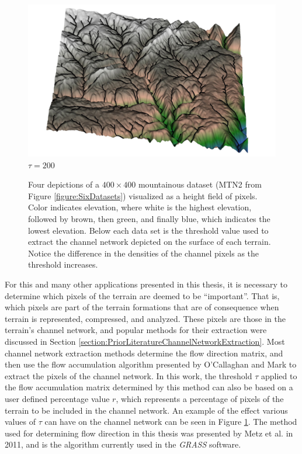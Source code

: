\begin{figure}[t]
\begin{center}
  \begin{minipage}{0.49\linewidth} \includegraphics[width=0.99\linewidth]{images/mtn2_T200.jpg}\\ \centering $\tau = 200$ \end{minipage}
\end{center}
\caption[Four mountain datasets with extracted channel networks]{\label{figure:mtn2_original} Four depictions of a $400 \times 400$ mountainous dataset (MTN2 from Figure \ref{figure:SixDatasets}) visualized as a height field of pixels. Color indicates elevation, where white is the highest elevation, followed by brown, then green, and finally blue, which indicates the lowest elevation. Below each data set is the threshold value used to extract the channel network depicted on the surface of each terrain. Notice the difference in the densities of the channel pixels as the threshold increases.}
\end{figure}

For this and many other applications presented in this thesis, it is necessary to determine which pixels of the terrain are deemed to be ``important''. That is, which pixels are part of the terrain formations that are of consequence when terrain is represented, compressed, and analyzed. These pixels are those in the terrain's channel network, and popular methods for their extraction were discussed in Section \ref{section:PriorLiteratureChannelNetworkExtraction}. Most channel network extraction methods determine the flow direction matrix, and then use the flow accumulation algorithm presented by O'Callaghan and Mark \cite{OCALLAGHAN-Extraction} to extract the pixels of the channel network. In this work, the threshold $\tau$ applied to the flow accumulation matrix determined by this method can also be based on a user defined percentage value $r$, which represents a percentage of pixels of the terrain to be included in the channel network.
An example of the effect various values of $\tau$ can have on the channel network can be seen in Figure \ref{figure:mtn2_original}.
The method used for determining flow direction in this thesis was presented by Metz et al. \cite{hess-15-667-2011} in 2011, and is the algorithm currently used in the \textit{GRASS} software.


